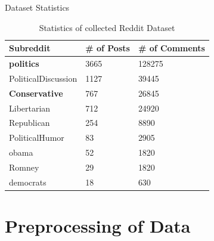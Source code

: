 \documentclass[aspectratio=169,notes]{beamer}
\begin{document}
\begin{frame}{Dataset Statistics}
 \begin{table}[]
\centering
\caption{Statistics of collected Reddit Dataset}
\begin{tabular}{@{}lll@{}}
\toprule
Subreddit                    & \# of Posts & \# of Comments \\ \midrule
\textbf{politics}            & 3665        & 128275         \\
PoliticalDiscussion          & 1127        & 39445          \\
\textbf{Conservative}        & 767         & 26845          \\
Libertarian                  & 712         & 24920          \\
Republican                   & 254         & 8890           \\
PoliticalHumor               & 83          & 2905           \\
obama                        & 52          & 1820           \\
Romney                       & 29          & 1820           \\
democrats                    & 18          & 630            \\ \bottomrule
\end{tabular}
\end{table}
\end{frame}

\section{Preprocessing of Data}
\end{document}
